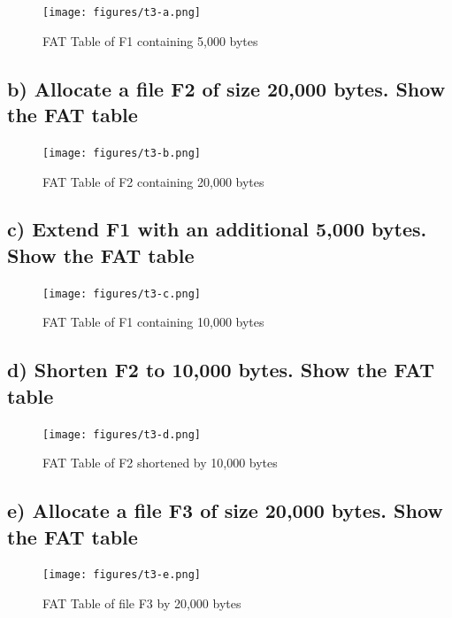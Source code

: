 \documentclass[11pt,a4paper]{article}
\theoremstyle{plain}
\theoremstyle{definition}
\theoremstyle{remark}
\numberwithin{equation}{section}
\begin{document}
\begin{figure}[H]
    \caption{FAT Table of F1 containing 5,000 bytes}
    \centering
    \texttt{[image: figures/t3-a.png]}
\end{figure}



\subsection*{b) Allocate a file F2 of size 20,000 bytes. Show the FAT table}

\begin{figure}[H]
    \caption{FAT Table of F2 containing 20,000 bytes}
    \centering
    \texttt{[image: figures/t3-b.png]}
\end{figure}



\subsection*{c) Extend F1 with an additional 5,000 bytes. Show the FAT table}

\begin{figure}[H]
    \caption{FAT Table of F1 containing 10,000 bytes}
    \centering
    \texttt{[image: figures/t3-c.png]}
\end{figure}



\subsection*{d) Shorten F2 to 10,000 bytes. Show the FAT table}

\begin{figure}[H]
    \caption{FAT Table of F2 shortened by 10,000 bytes}
    \centering
    \texttt{[image: figures/t3-d.png]}
\end{figure}



\subsection*{e) Allocate a file F3 of size 20,000 bytes. Show the FAT table}

\begin{figure}[H]
    \caption{FAT Table of file F3 by 20,000 bytes}
    \centering
    \texttt{[image: figures/t3-e.png]}
\end{figure}
\end{document}
